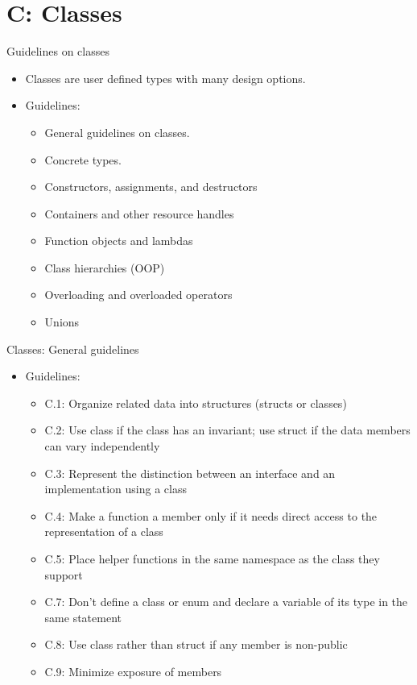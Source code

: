 \section{C: Classes}

\begin{frame}[t]{Guidelines on classes}
\begin{itemize}
  \item Classes are user defined types with many design options.

  \item Guidelines:
    \begin{itemize}
      \item General guidelines on classes.
      \item Concrete types.
      \item Constructors, assignments, and destructors
      \item Containers and other resource handles
      \item Function objects and lambdas
      \item Class hierarchies (OOP)
      \item Overloading and overloaded operators
      \item Unions
    \end{itemize}
\end{itemize}
\end{frame}

\begin{frame}[t]{Classes: General guidelines}
\begin{itemize}
  \item Guidelines:
    \begin{itemize}
      \item C.1: Organize related data into structures (structs or classes)
      \item C.2: Use class if the class has an invariant; use struct if the data members can vary independently
      \item C.3: Represent the distinction between an interface and an implementation using a class
      \item C.4: Make a function a member only if it needs direct access to the representation of a class
      \item C.5: Place helper functions in the same namespace as the class they support
      \item C.7: Don’t define a class or enum and declare a variable of its type in the same statement
      \item C.8: Use class rather than struct if any member is non-public
      \item C.9: Minimize exposure of members
    \end{itemize}
\end{itemize}
\end{frame}

